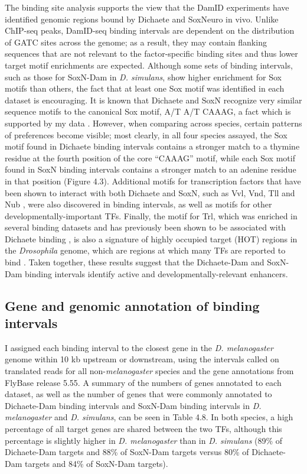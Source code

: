 The binding site analysis supports the view that the DamID experiments have identified genomic regions bound by Dichaete and SoxNeuro in vivo. Unlike ChIP-seq peaks, DamID-seq binding intervals are dependent on the distribution of GATC sites across the genome; as a result, they may contain flanking sequences that are not relevant to the factor-specific binding sites and thus lower target motif enrichments are expected. Although some sets of binding intervals, such as those for SoxN-Dam in \emph{D. simulans}, show higher enrichment for Sox motifs than others, the fact that at least one Sox motif was identified in each dataset is encouraging. It is known that Dichaete and SoxN recognize very similar sequence motifs to the canonical Sox motif, A/T A/T CAAAG, a fact which is supported by my data \citep{aleksic_role_2013,ferrero_soxneuro_2014}. However, when comparing across species, certain patterns of preferences become visible; most clearly, in all four species assayed, the Sox motif found in Dichaete binding intervals contains a stronger match to a thymine residue at the fourth position of the core “CAAAG” motif, while each Sox motif found in SoxN binding intervals contains a stronger match to an adenine residue in that position (Figure 4.3). Additional motifs for transcription factors that have been shown to interact with both Dichaete and SoxN, such as Vvl, Vnd, Tll and Nub \citep{aleksic_role_2013,ferrero_soxneuro_2014,soriano_drosophila_1998}, were also discovered in binding intervals, as well as motifs for other developmentally-important TFs. Finally, the motif for Trl, which was enriched in several binding datasets and has previously been shown to be associated with Dichaete binding \citep{aleksic_role_2013}, is also a signature of highly occupied target (HOT) regions in the \emph{Drosophila} genome, which are regions at which many TFs are reported to bind \citep{kvon_hot_2012}. Taken together, these results suggest that the Dichaete-Dam and SoxN-Dam binding intervals identify active and developmentally-relevant enhancers.

\subsection{Gene and genomic annotation of binding intervals}
I assigned each binding interval to the closest gene in the \emph{D. melanogaster} genome within 10 kb upstream or downstream, using the intervals called on translated reads for all non-\emph{melanogaster} species and the gene annotations from FlyBase release 5.55. A summary of the numbers of genes annotated to each dataset, as well as the number of genes that were commonly annotated to Dichaete-Dam binding intervals and SoxN-Dam binding intervals in \emph{D. melanogaster} and \emph{D. simulans}, can be seen in Table 4.8. In both species, a high percentage of all target genes are shared between the two TFs, although this percentage is slightly higher in \emph{D. melanogaster} than in \emph{D. simulans} (89\% of Dichaete-Dam targets and 88\% of SoxN-Dam targets versus 80\% of Dichaete-Dam targets and 84\% of SoxN-Dam targets).\\

